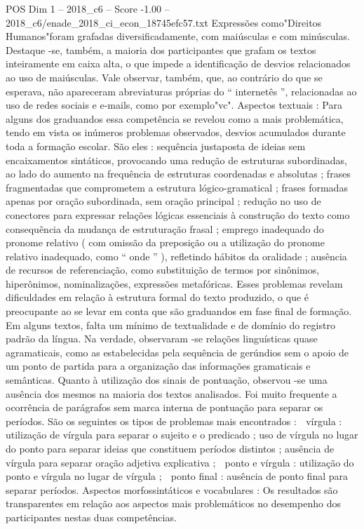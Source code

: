 \begin{textsample}{POS Dim 1 – 2018\_c6 – Score -1.00 – 2018\_c6/enade\_2018\_ci\_econ\_18745efc57.txt}
Expressões como"Direitos Humanos"foram grafadas diversificadamente, com maiúsculas e com minúsculas.
Destaque -se, também, a maioria dos participantes que grafam os textos inteiramente em caixa alta, o que impede a identificação de desvios relacionados ao uso de maiúsculas.
Vale observar, também, que, ao contrário do que se esperava, não apareceram abreviaturas próprias do “ internetês ”, relacionadas ao uso de redes sociais e e-mails, como por exemplo"vc".
Aspectos textuais : Para alguns dos graduandos essa competência se revelou como a mais problemática, tendo em vista os inúmeros problemas observados, desvios acumulados durante toda a formação escolar.
São eles : sequência justaposta de ideias sem encaixamentos sintáticos, provocando uma redução de estruturas subordinadas, ao lado do aumento na frequência de estruturas coordenadas e absolutas ; frases fragmentadas que comprometem a estrutura lógico-gramatical ; frases formadas apenas por oração subordinada, sem oração principal ; redução no uso de conectores para expressar relações lógicas essenciais à construção do texto como consequência da mudança de estruturação frasal ; emprego inadequado do pronome relativo ( com omissão da preposição ou a utilização do pronome relativo inadequado, como “ onde ” ), refletindo hábitos da oralidade ; ausência de recursos de referenciação, como substituição de termos por sinônimos, hiperônimos, nominalizações, expressões metafóricas.
Esses problemas revelam dificuldades em relação à estrutura formal do texto produzido, o que é preocupante ao se levar em conta que são graduandos em fase final de formação.
Em alguns textos, falta um mínimo de textualidade e de domínio do registro padrão da língua.
Na verdade, observaram -se relações linguísticas quase agramaticais, como as estabelecidas pela sequência de gerúndios sem o apoio de um ponto de partida para a organização das informações gramaticais e semânticas.
Quanto à utilização dos sinais de pontuação, observou -se uma ausência dos mesmos na maioria dos textos analisados.
Foi muito frequente a ocorrência de parágrafos sem marca interna de pontuação para separar os períodos.
São os seguintes os tipos de problemas mais encontrados :  vírgula : utilização de vírgula para separar o sujeito e o predicado ; uso de vírgula no lugar do ponto para separar ideias que constituem períodos distintos ; ausência de vírgula para separar oração adjetiva explicativa ;  ponto e vírgula : utilização do ponto e vírgula no lugar de vírgula ;  ponto final : ausência de ponto final para separar períodos.
Aspectos morfossintáticos e vocabulares : Os resultados são transparentes em relação aos aspectos mais problemáticos no desempenho dos participantes nestas duas competências.

\end{textsample}
